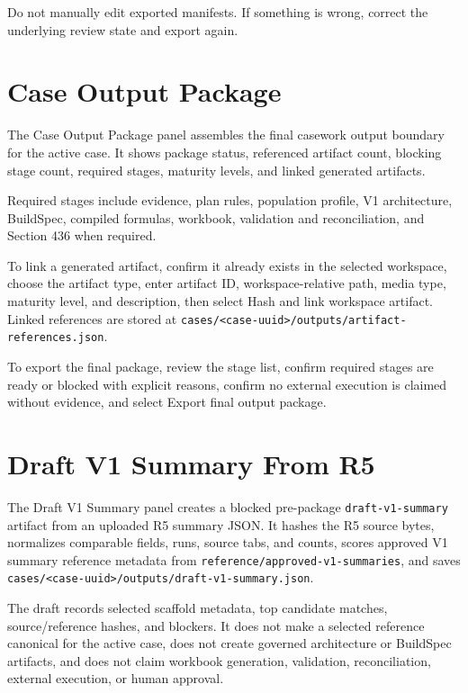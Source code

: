 Do not manually edit exported manifests. If something is wrong, correct the underlying review state and export again.

\section{Case Output Package}

The Case Output Package panel assembles the final casework output boundary for the active case. It shows package status, referenced artifact count, blocking stage count, required stages, maturity levels, and linked generated artifacts.

Required stages include evidence, plan rules, population profile, V1 architecture, BuildSpec, compiled formulas, workbook, validation and reconciliation, and Section 436 when required.

To link a generated artifact, confirm it already exists in the selected workspace, choose the artifact type, enter artifact ID, workspace-relative path, media type, maturity level, and description, then select Hash and link workspace artifact. Linked references are stored at \texttt{cases/\textless case-uuid\textgreater/outputs/artifact-references.json}.

To export the final package, review the stage list, confirm required stages are ready or blocked with explicit reasons, confirm no external execution is claimed without evidence, and select Export final output package.

\section{Draft V1 Summary From R5}

The Draft V1 Summary panel creates a blocked pre-package \texttt{draft-v1-summary} artifact from an uploaded R5 summary JSON. It hashes the R5 source bytes, normalizes comparable fields, runs, source tabs, and counts, scores approved V1 summary reference metadata from \texttt{reference/approved-v1-summaries}, and saves \texttt{cases/\textless case-uuid\textgreater/outputs/draft-v1-summary.json}.

The draft records selected scaffold metadata, top candidate matches, source/reference hashes, and blockers. It does not make a selected reference canonical for the active case, does not create governed architecture or BuildSpec artifacts, and does not claim workbook generation, validation, reconciliation, external execution, or human approval.

